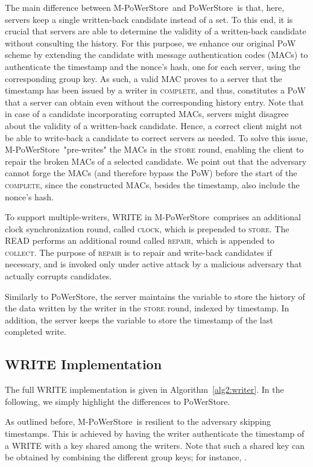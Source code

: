 \documentclass[10pt,conference,compsocconf]{IEEEtran}
\newcommand{\protocol}{PoWerStore}
\newcommand{\mprotocol}{M-PoWerStore}
\newcommand{\complete}{\textsc{complete}}
\begin{document}
The main difference between \mprotocol\ and \protocol\ is that, here, servers keep a single written-back candidate instead of a set. To this end, it is crucial that servers are able to determine the validity of a written-back candidate without consulting the history. For this purpose, we enhance our original PoW scheme by extending the candidate with message authentication codes (MACs) to authenticate the timestamp and the nonce's hash, one for each server, using the corresponding group key. As such, a valid MAC proves to a server that the timestamp has been issued by a writer in \complete, and thus, constitutes a PoW that a server can obtain even without the corresponding history entry. Note that in case of a candidate incorporating corrupted MACs, servers might disagree about the validity of a written-back candidate. Hence, a correct client might not be able to write-back a candidate to  correct servers as needed. To solve this issue, \mprotocol\ "pre-writes" the MACs in the \textsc{store} round, enabling the client to repair the broken MACs of a selected candidate. We point out that the adversary cannot forge the MACs (and therefore bypass the PoW) before the start of the \complete, since the constructed MACs, besides the timestamp, also include the nonce's hash.

To support multiple-writers, \textsc{WRITE} in \mprotocol\ comprises an additional clock synchronization round, called \textsc{clock}, which is prepended to \textsc{store}. The \textsc{READ} performs an additional round called \textsc{repair}, which is appended to \textsc{collect}. The purpose of \textsc{repair} is to repair and write-back candidates if necessary, and is invoked only under active attack by a malicious adversary that actually corrupts candidates.

Similarly to \protocol, the server maintains the variable  to store the history of the data written by the writer in the \textsc{store} round, indexed by timestamp. In addition, the server keeps the variable  to store the timestamp of the last completed write.

\subsection{\textsc{WRITE} Implementation}
The full \textsc{WRITE} implementation is given in Algorithm~\ref{alg2:writer}. In the following, we simply highlight the differences to \protocol.

As outlined before, \mprotocol\ is resilient to the adversary skipping timestamps. This is achieved by having the writer authenticate the timestamp of a \textsc{WRITE} with a key  shared among the writers. Note that such a shared key can be obtained by combining the different group keys; for instance, .
\end{document}
